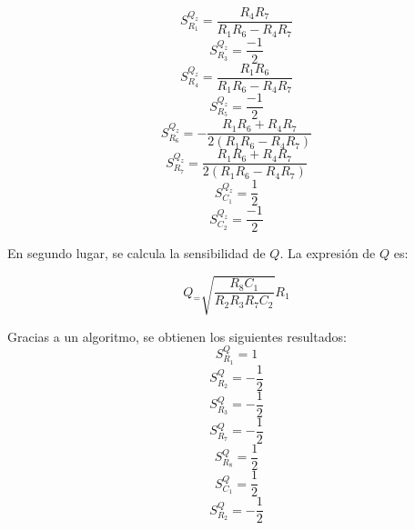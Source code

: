 \begin{displaymath}  S^{Q_z}_{R_1} = \frac{R_4 R_7} {R_1 R_6 - R_4 R_7}\end{displaymath}
\begin{displaymath}  S^{Q_z}_{R_3} = \frac{-1} {2}\end{displaymath}
\begin{displaymath}  S^{Q_z}_{R_4} = \frac{R_1 R_6} {R_1 R_6 - R_4 R_7}\end{displaymath}
\begin{displaymath}  S^{Q_z}_{R_5} = \frac{-1} {2}\end{displaymath}
\begin{displaymath}  S^{Q_z}_{R_6} = -\frac{R_1 R_6 + R_4 R_7} {2(R_1 R_6 - R_4 R_7)}\end{displaymath}
\begin{displaymath}  S^{Q_z}_{R_7} = \frac{R_1 R_6 + R_4 R_7} {2(R_1 R_6 - R_4 R_7)}\end{displaymath}
\begin{displaymath}  S^{Q_z}_{C_1} = \frac{1} {2}\end{displaymath}
\begin{displaymath}  S^{Q_z}_{C_2} = \frac{-1} {2}\end{displaymath}

En segundo lugar, se calcula la sensibilidad de $Q$. La expresión de $Q$ es:

\begin{displaymath} Q_ = \sqrt{\frac{R_8 C_1 }{R_2 R_3 R_7 C_2}} R_1\end{displaymath}

Gracias a un algoritmo, se obtienen los siguientes resultados:
\begin{displaymath}  S^{Q}_{R_1} = 1\end{displaymath}
\begin{displaymath}  S^{Q}_{R_2} = -\frac{1}{2}\end{displaymath}
\begin{displaymath}  S^{Q}_{R_3} = -\frac{1}{2}\end{displaymath}
\begin{displaymath}  S^{Q}_{R_7} = -\frac{1}{2}\end{displaymath}
\begin{displaymath}  S^{Q}_{R_8} = \frac{1}{2}\end{displaymath}
\begin{displaymath}  S^{Q}_{C_1} = \frac{1}{2}\end{displaymath}
\begin{displaymath}  S^{Q}_{R_2} = -\frac{1}{2}\end{displaymath}

